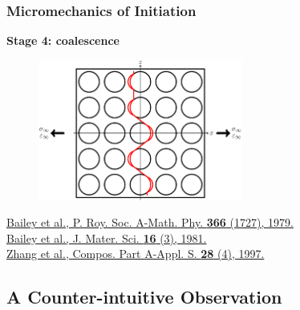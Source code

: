 \documentclass[first,firstsupp,lastsupp,last,hyperref,table]{ETHclass}
\begin{document}
\begin{frame}
\frametitle{\vspace{0.2cm}\small Micromechanics of Initiation}
\vspace{-0.5cm}
\centering
\begin{alertblock}{\centering\scriptsize\bf Stage 4: coalescence}
\vspace{-0.25cm}
\begin{figure}
\centering
\includegraphics[width=0.6\textwidth]{stage4-coalescence.pdf}
\end{figure}
\end{alertblock}
\vspace{-0.5cm}
\pgfmathsetmacro{}
\pgfmathsetmacro{}
{\fontsize{\fontsizeref}{\stretchref} \selectfont \href{https://doi.org/10.1098/rspa.1979.0071}{Bailey et al., P. Roy. Soc. A-Math. Phy. \textbf{366} (1727), 1979.}}\\\vspace{-5pt}
{\fontsize{\fontsizeref}{\stretchref} \selectfont \href{https://doi.org/10.1007/BF00552203}{Bailey et al., J. Mater. Sci. \textbf{16} (3), 1981.}}\\\vspace{-5pt}
{\fontsize{\fontsizeref}{\stretchref} \selectfont \href{https://doi.org/10.1016/S1359-835X(96)00123-6}{Zhang et al., Compos. Part A-Appl. S. \textbf{28} (4), 1997.}}
\end{frame}

\subsection{A Counter-intuitive Observation}
\end{document}
